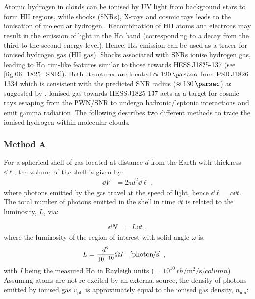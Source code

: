 Atomic hydrogen in clouds can be ionised by UV light from background stars to form HII regions, while shocks (SNRs), X-rays and cosmic rays leads to the ionisation of molecular hydrogen \citep{2011piim.book.....D}. Recombination of HII atoms and electrons may result in the emission of light in the H$\alpha$ band (corresponding to a decay from the third to the second energy level). Hence, H$\alpha$ emission can be used as a tracer for ionised hydrogen gas (HII gas). Shocks associated with SNRs ionise hydrogen gas, leading to H$\alpha$ rim-like features similar to those towards \mbox{HESS\,J1825-137} (see \autoref{fig:06_1825_SNR}). Both structures are located $\approx 120\,\pc$ from \mbox{PSR\,J1826-1334} which is consistent with the predicted SNR radius ($\approx 130\,\pc$) as suggested by \cite{deJager2009}.
\newpar
Ionised gas towards \mbox{HESS\,J1825-137} acts as a target for cosmic rays escaping from the PWN/SNR to undergo hadronic/leptonic interactions and emit gamma radiation. The following describes two different methods to trace the ionised hydrogen within molecular clouds.

\subsubsection{Method A}

For a spherical shell of gas located at distance $d$ from the Earth with thickness $\dd{\ell}$, the volume of the shell is given by:
\begin{equation}
    \begin{aligned}
        \dd{V}&=2\pi d^2 \dd{\ell}\text{ ,}
    \end{aligned}
\end{equation}
\noindent where photons emitted by the gas travel at the speed of light, hence $\dd{\ell}=c\dd{t}$. The total number of photons emitted in the shell in time $\dd{t}$ is related to the luminosity, $L$, via:

\begin{equation}
    \begin{aligned}
        \dd{N}&=L\dd{t}\text{ ,}
    \end{aligned}
\end{equation}
\noindent where the luminosity of the region of interest with solid angle $\omega$ is:
\begin{equation}
    \begin{aligned}
        L&=\frac{d^2}{10^{-10}}\Omega I\quad \qty[\text{photon/s}]\text{ ,}
    \end{aligned}
\end{equation}
\noindent with $I$ being the measured H$\alpha$ in Rayleigh units ($=10^{10}\,\si{ph\per\meter\squared\per\second\per{column}}$). Assuming atoms are not re-excited by an external source, the density of photons emitted by ionised gas $u_\text{ph}$ is approximately equal to the ionised gas density, $n_\text{ion}$:

